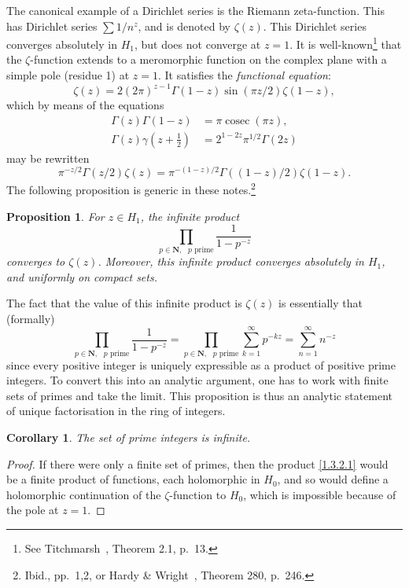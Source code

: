 \documentclass[10pt]{article}
\newtheorem{prop}[theo]{Proposition}
\newtheorem{coro}[theo]{Corollary}
\theoremstyle{definition}
\def\NN{\mathbf{N}}
\def\fnei{See Titchmarsh~\cite{bib:195}, Theorem 2.1, p.~13.}
\def\fnni{Ibid., pp.~1,2, or Hardy \& Wright~\cite{bib:86}, Theorem 280, p.~246.}
\begin{document}
The canonical example of a Dirichlet series is the Riemann zeta-function.
This has Dirichlet series $\sum 1/n^z$, and is denoted by $\zeta(z)$.
This Dirichlet series converges absolutely in $H_1$, but does not converge at $z = 1$.
It is well-known\footnote{\fnei} that the $\zeta$-function extends to a meromorphic function on the complex plane with a simple pole (residue 1) at $z = 1$.
It satisfies the \emph{functional equation}:
\begin{equation}
\label{1.3.1}
\zeta(z) = 2 (2\pi)^{z-1} \Gamma(1-z) \sin(\pi z/2) \zeta(1-z),
\end{equation}
which by means of the equations
\begin{align*}
\Gamma(z) \Gamma(1-z)
&= \pi \operatorname{cosec} (\pi z),
\\
\Gamma(z) \gamma(z + \tfrac 12) 
&= 2^{1-2z} \pi^{1/2} \Gamma(2z)
\end{align*}
may be rewritten
\[
\pi^{-z/2} \Gamma(z/2) \zeta(z)
= \pi^{-(1-z)/2} \Gamma((1-z)/2) \zeta(1-z).
\]
The following proposition is generic in these notes.\footnote{\fnni}


\begin{prop}
\label{1.3.2}
For $z \in H_1$, the infinite product
\begin{equation}
\label{1.3.2.1}
\prod_{p \in \NN,\text{ $p$ prime}}
\frac{1}{1-p^{-z}}
\end{equation}
converges to $\zeta(z)$.
Moreover, this infinite product converges absolutely in $H_1$, and uniformly on compact sets.
\end{prop}

The fact that the value of this infinite product is $\zeta(z)$ is essentially that (formally)
\[
\prod_{p \in \NN,\text{ $p$ prime}}
\frac{1}{1-p^{-z}}
= \prod_{p \in \NN,\text{ $p$ prime}}
\sum_{k=1}^\infty p^{-kz}
= \sum_{n=1}^\infty n^{-z}
\]
since every positive integer is uniquely expressible as a product of positive prime integers.
To convert this into an analytic argument, one has to work with finite sets of primes and take the limit.
This proposition is thus an analytic statement of unique factorisation in the ring of integers.


\begin{coro}
\label{1.3.3}
The set of prime integers is infinite.
\end{coro}

\begin{proof}
If there were only a finite set of primes, then the product \eqref{1.3.2.1} would be a finite product of functions, each holomorphic in $H_0$, and so would define a holomorphic continuation of the $\zeta$-function to $H_0$, which is impossible because of the pole at $z = 1$.
\end{proof}
\end{document}

